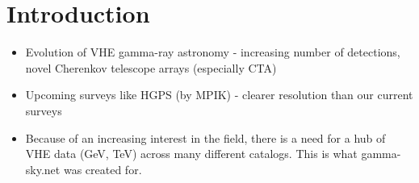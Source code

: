 \section{Introduction}

\begin{itemize}

\item Evolution of VHE gamma-ray astronomy - increasing number of detections, novel Cherenkov telescope arrays (especially CTA)

\item Upcoming surveys like HGPS (by MPIK) - clearer resolution than our current surveys

\item Because of an increasing interest in the field, there is a need for a hub of VHE data (GeV, TeV) across many different catalogs.
This is what gamma-sky.net was created for.

\end{itemize}
